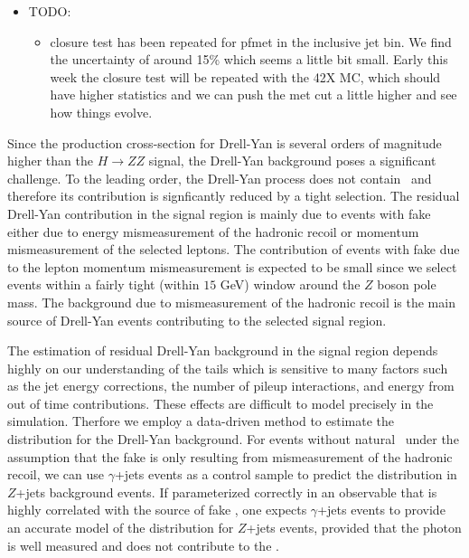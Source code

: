 
\begin{itemize}
\item TODO:
\begin{itemize}
    \item closure test has been repeated for pfmet in the inclusive jet bin.  
We find the uncertainty of around 15\% which seems a little bit small.  
Early this week the closure test will be repeated with the 42X MC, which should have
higher statistics and we can push the met cut a little higher and see how things evolve.
\end{itemize}
\end{itemize}

Since the production cross-section for Drell-Yan is several orders of magnitude 
higher than the $H \to ZZ$ signal, the Drell-Yan background poses a significant 
challenge. To the leading order, the Drell-Yan process does not contain \met\,  
and therefore its contribution is signficantly reduced by a tight \met selection. 
The residual Drell-Yan contribution in the signal region 
is mainly due to events with fake \met either due to energy mismeasurement of  
the hadronic recoil or momentum mismeasurement of the selected leptons. 
The contribution of events with fake \met due to the lepton momentum mismeasurement 
is expected to be small since we select events within a fairly tight (within $15$ GeV) window 
around the $Z$ boson pole mass. The background due to mismeasurement of the hadronic
recoil is the main source of Drell-Yan events contributing to the selected signal region.

The estimation of residual Drell-Yan background in the signal region depends highly on
our understanding of the \met tails which is sensitive to many factors such as 
the jet energy corrections, the number of pileup interactions, and energy from out of time
contributions. These effects are difficult to model precisely in the simulation.
Therfore we employ a data-driven method to estimate the \met distribution for the 
Drell-Yan background. For events without natural \met\, under the assumption that 
the fake \met is only resulting from mismeasurement of the hadronic recoil, we can use
$\gamma$+jets events as a control sample to predict the \met distribution in $Z$+jets
background events. If parameterized correctly in an observable that is highly correlated 
with the source of fake \met, one expects $\gamma$+jets events to provide an accurate
model of the \met distribution for $Z$+jets events, provided that the photon
is well measured and does not contribute to the \met.

